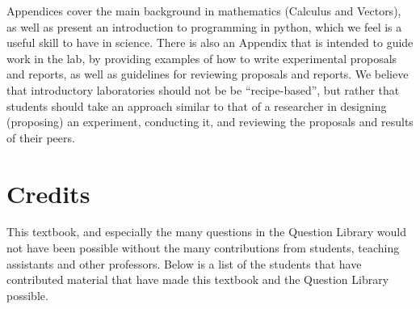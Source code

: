 Appendices cover the main background in mathematics (Calculus and Vectors), as well as present an introduction to programming in python, which we feel is a useful skill to have in science. There is also an Appendix that is intended to guide work in the lab, by providing examples of how to write experimental proposals and reports, as well as guidelines for reviewing proposals and reports. We believe that introductory laboratories should not be be ``recipe-based'', but rather that students should take an approach similar to that of a researcher in designing (proposing) an experiment, conducting it, and reviewing the proposals and results of their peers.

\section*{Credits}
This textbook, and especially the many questions in the Question Library would not have been possible without the many contributions from students, teaching assistants and other professors. Below is a list of the students that have contributed material that have made this textbook and the Question Library possible.

